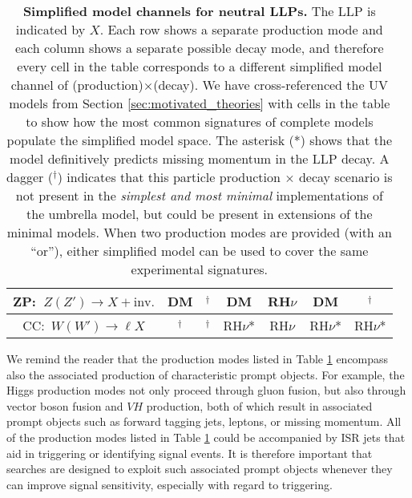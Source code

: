\begin{table}
\begin{center}
\begin{tabular}{ |c|c|c|c|c|c|c| }
 \hline 
 ZP:~$Z(Z')\rightarrow X+\mathrm{inv.}$ & DM  & ${}^\dagger$ & DM &  RH$\nu$ & DM & ${}^\dagger$\\
  \hline
   CC:~$W(W')\rightarrow \ell X$ & ${}^\dagger$  & ${}^\dagger$ & RH$\nu$* & RH$\nu$ & RH$\nu$* & RH$\nu$* \\
  \hline
\end{tabular}
%
\end{center}
\caption{{\bf Simplified model channels for neutral LLPs.} The LLP is indicated by $X$. Each row shows a separate production mode and each column shows a separate possible decay mode, and therefore every cell in the table corresponds to a different simplified model channel of (production)$\times$(decay). We have cross-referenced the UV models from Section \ref{sec:motivated_theories} with cells in the table to show how the most common signatures of complete models populate the simplified model space. The asterisk (*) shows that the model definitively predicts missing momentum in the LLP decay. A dagger (${}^\dagger$) indicates that this particle production $\times$ decay scenario is not present in the \emph{simplest and most minimal} implementations of the umbrella model, but could be present in extensions of the minimal models. When two production modes are provided (with an ``or''), either simplified model can be used to cover the same experimental signatures.  }\label{tab:neutral_LLP}
\end{table}

We remind the reader that the production modes listed in Table
\ref{tab:neutral_LLP} encompass also the associated production of
characteristic prompt objects. For example, the Higgs production modes
not only proceed through gluon fusion, but also through vector boson
fusion and $VH$ production, both of which result in associated prompt
objects such as forward tagging jets, leptons, or missing
momentum. All of the production modes listed in Table
\ref{tab:neutral_LLP} could be accompanied by ISR jets that aid in
triggering or identifying signal events. It is therefore important
that searches are designed to exploit such associated prompt objects
whenever they can improve signal sensitivity, especially with regard to triggering.

